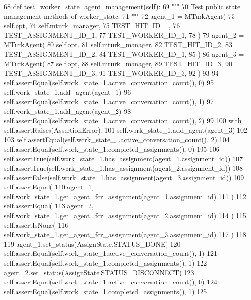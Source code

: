 \begin{DoxyCode}
68     \textcolor{keyword}{def }test\_worker\_state\_agent\_management(self):
69         \textcolor{stringliteral}{"""}
70 \textcolor{stringliteral}{        Test public state management methods of worker\_state.}
71 \textcolor{stringliteral}{        """}
72         agent\_1 = MTurkAgent(
73             self.opt,
74             self.mturk\_manager,
75             TEST\_HIT\_ID\_1,
76             TEST\_ASSIGNMENT\_ID\_1,
77             TEST\_WORKER\_ID\_1,
78         )
79         agent\_2 = MTurkAgent(
80             self.opt,
81             self.mturk\_manager,
82             TEST\_HIT\_ID\_2,
83             TEST\_ASSIGNMENT\_ID\_2,
84             TEST\_WORKER\_ID\_1,
85         )
86         agent\_3 = MTurkAgent(
87             self.opt,
88             self.mturk\_manager,
89             TEST\_HIT\_ID\_3,
90             TEST\_ASSIGNMENT\_ID\_3,
91             TEST\_WORKER\_ID\_3,
92         )
93 
94         self.assertEqual(self.work\_state\_1.active\_conversation\_count(), 0)
95         self.work\_state\_1.add\_agent(agent\_1)
96         self.assertEqual(self.work\_state\_1.active\_conversation\_count(), 1)
97         self.work\_state\_1.add\_agent(agent\_2)
98         self.assertEqual(self.work\_state\_1.active\_conversation\_count(), 2)
99 
100         with self.assertRaises(AssertionError):
101             self.work\_state\_1.add\_agent(agent\_3)
102 
103         self.assertEqual(self.work\_state\_1.active\_conversation\_count(), 2)
104         self.assertEqual(self.work\_state\_1.completed\_assignments(), 0)
105 
106         self.assertTrue(self.work\_state\_1.has\_assignment(agent\_1.assignment\_id))
107         self.assertTrue(self.work\_state\_1.has\_assignment(agent\_2.assignment\_id))
108         self.assertFalse(self.work\_state\_1.has\_assignment(agent\_3.assignment\_id))
109         self.assertEqual(
110             agent\_1, self.work\_state\_1.get\_agent\_for\_assignment(agent\_1.assignment\_id)
111         )
112         self.assertEqual(
113             agent\_2, self.work\_state\_1.get\_agent\_for\_assignment(agent\_2.assignment\_id)
114         )
115         self.assertIsNone(
116             self.work\_state\_1.get\_agent\_for\_assignment(agent\_3.assignment\_id)
117         )
118 
119         agent\_1.set\_status(AssignState.STATUS\_DONE)
120         self.assertEqual(self.work\_state\_1.active\_conversation\_count(), 1)
121         self.assertEqual(self.work\_state\_1.completed\_assignments(), 1)
122         agent\_2.set\_status(AssignState.STATUS\_DISCONNECT)
123         self.assertEqual(self.work\_state\_1.active\_conversation\_count(), 0)
124         self.assertEqual(self.work\_state\_1.completed\_assignments(), 1)
125 
\end{DoxyCode}
